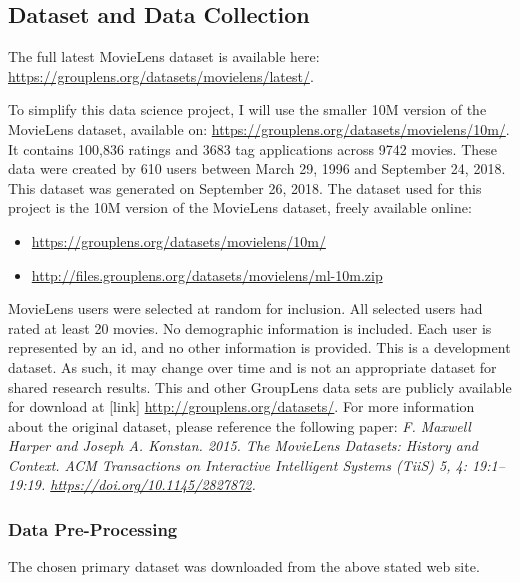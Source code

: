 \documentclass[
]{article}
\providecommand{\tightlist}{%
  \setlength{\itemsep}{0pt}\setlength{\parskip}{0pt}}
\begin{document}
\hypertarget{dataset-and-data-collection}{%
\subsection{Dataset and Data
Collection}\label{dataset-and-data-collection}}

The full latest MovieLens dataset is available here:
\url{https://grouplens.org/datasets/movielens/latest/}.

To simplify this data science project, I will use the smaller 10M
version of the MovieLens dataset, available on:
\url{https://grouplens.org/datasets/movielens/10m/}. It contains 100,836
ratings and 3683 tag applications across 9742 movies. These data were
created by 610 users between March 29, 1996 and September 24, 2018. This
dataset was generated on September 26, 2018. The dataset used for this
project is the 10M version of the MovieLens dataset, freely available
online:

\begin{itemize}
\tightlist
\item
  \url{https://grouplens.org/datasets/movielens/10m/}~\\
\item
  \url{http://files.grouplens.org/datasets/movielens/ml-10m.zip}
\end{itemize}

MovieLens users were selected at random for inclusion. All selected
users had rated at least 20 movies. No demographic information is
included. Each user is represented by an id, and no other information is
provided. This is a development dataset. As such, it may change over
time and is not an appropriate dataset for shared research results. This
and other GroupLens data sets are publicly available for download at
{[}link{]} \url{http://grouplens.org/datasets/}. For more information
about the original dataset, please reference the following paper:
\emph{F. Maxwell Harper and Joseph A. Konstan. 2015. The MovieLens
Datasets: History and Context. ACM Transactions on Interactive
Intelligent Systems (TiiS) 5, 4: 19:1--19:19.
\url{https://doi.org/10.1145/2827872}.}

\hypertarget{data-pre-processing}{%
\subsubsection{Data Pre-Processing}\label{data-pre-processing}}

The chosen primary dataset was downloaded from the above stated web
site.
\end{document}
